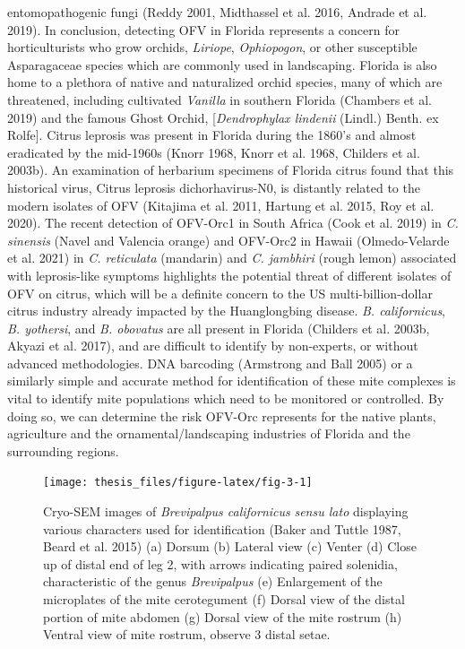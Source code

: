 \documentclass[12pt,final,CPage]{ufthesis}
\begin{document}
{entomopathogenic fungi (Reddy 2001, Midthassel et al. 2016, Andrade et al. 2019). In conclusion, detecting OFV in Florida represents a concern for horticulturists who grow orchids, \emph{Liriope}, \emph{Ophiopogon}, or other susceptible Asparagaceae species which are commonly used in landscaping. Florida is also home to a plethora of native and naturalized orchid species, many of which are threatened, including cultivated \emph{Vanilla} in southern Florida (Chambers et al. 2019) and the famous Ghost Orchid, {[}\emph{Dendrophylax lindenii} (Lindl.) Benth. ex Rolfe{]}. Citrus leprosis was present in Florida during the 1860's and almost eradicated by the mid-1960s (Knorr 1968, Knorr et al. 1968, Childers et al. 2003b). An examination of herbarium specimens of Florida citrus found that this historical virus, Citrus leprosis dichorhavirus-N0, is distantly related to the modern isolates of OFV (Kitajima et al. 2011, Hartung et al. 2015, Roy et al. 2020). The recent detection of OFV-Orc1 in South Africa (Cook et al. 2019) in \emph{C. sinensis} (Navel and Valencia orange) and OFV-Orc2 in Hawaii (Olmedo-Velarde et al. 2021) in \emph{C. reticulata} (mandarin) and \emph{C. jambhiri} (rough lemon) associated with leprosis-like symptoms highlights the potential threat of different isolates of OFV on citrus, which will be a definite concern to the US multi-billion-dollar citrus industry already impacted by the Huanglongbing disease. \emph{B. californicus}, \emph{B. yothersi}, and \emph{B. obovatus} are all present in Florida (Childers et al. 2003b, Akyazi et al. 2017), and are difficult to identify by non-experts, or without advanced methodologies. DNA barcoding (Armstrong and Ball 2005) or a similarly simple and accurate method for identification of these mite complexes is vital to identify mite populations which need to be monitored or controlled. By doing so, we can determine the risk OFV-Orc represents for the native plants, agriculture and the ornamental/landscaping industries of Florida and the surrounding regions.
  \begin{figure}

  {\centering \texttt{[image: thesis\_files/figure-latex/fig-3-1]} 

  }

  \caption{Cryo-SEM images of \textit{Brevipalpus californicus} \textit{sensu lato} displaying various characters used for identification (Baker and Tuttle 1987, Beard et al. 2015) (a) Dorsum  (b) Lateral view (c) Venter (d) Close up of distal end of leg 2, with arrows indicating paired solenidia, characteristic of the genus \textit{Brevipalpus} (e) Enlargement of the microplates of the mite cerotegument (f) Dorsal view of the distal portion of mite abdomen (g) Dorsal view of the mite rostrum (h) Ventral view of mite rostrum, observe 3 distal setae.}\label{fig:fig-3}
  \end{figure}
  \hypertarget{references}{%
}}
\end{document}

